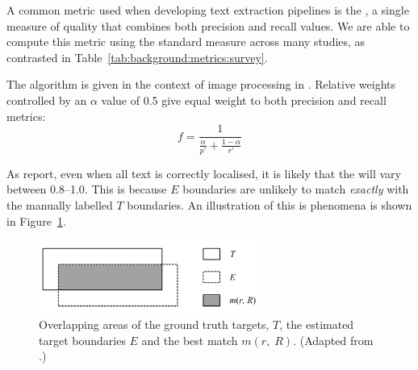 A common metric used when developing text extraction pipelines is the \fscore, a single measure of quality that combines both precision and recall values. We are able to compute this metric using the standard measure across many studies, as contrasted in Table~\ref{tab:background:metrics:survey}.

The \fscore{} algorithm is given in the context of image processing in \citet{Lucas:2003iw}. Relative weights controlled by an $\alpha$ value of 0.5 give equal weight to both precision and recall metrics:
\begin{equation*}
  f = \frac{1}{\frac{\alpha}{p'} + \frac{1-\alpha}{r'}}
\end{equation*}

As \citet{Chen:2011ul} report, even when all text is correctly localised, it is likely that the \fscore{} will vary between 0.8--1.0. This is because $E$ boundaries are unlikely to match \textit{exactly} with the manually labelled $T$ boundaries. An illustration of this is phenomena is shown in Figure~\ref{fig:background:metrics:ye2005_overlapping}.

\begin{figure}[p]
  \centering
  \includegraphics[width=0.65\textwidth]{images/background/ye2005_overlapping}
  \caption[Overlapping areas of ground truth and estimated targets]{Overlapping areas of the ground truth targets, $T$, the estimated target boundaries $E$ and the best match $m(r,\;R)$. (Adapted from \citep{Ye:2005wu}.)}
  \label{fig:background:metrics:ye2005_overlapping}
\end{figure}

